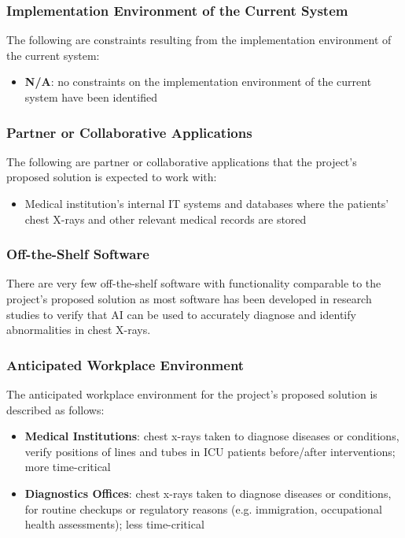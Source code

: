 \documentclass[12pt]{article}
\begin{document}
\subsubsection{Implementation Environment of the Current System}
The following are constraints resulting from the implementation environment of the current system:
\begin{itemize}
    \item \textbf{N/A}: no constraints on the implementation environment of the current system have been identified
\end{itemize}

\subsubsection{Partner or Collaborative Applications}
The following are partner or collaborative applications that the project’s proposed solution is expected to work with:
\begin{itemize}
    \item Medical institution’s internal IT systems and databases where the patients’ chest X-rays and other relevant medical records are stored
\end{itemize}

\subsubsection{Off-the-Shelf Software}
There are very few off-the-shelf software with functionality comparable to the project’s proposed solution as most software has been developed in research studies to verify that AI can be used to accurately diagnose and identify abnormalities in chest X-rays. 

\subsubsection{Anticipated Workplace Environment}
The anticipated workplace environment for the project’s proposed solution is described as follows:
\begin{itemize}
    \item \textbf{Medical Institutions}: chest x-rays taken to diagnose diseases or conditions, verify positions of lines and tubes in ICU patients before/after interventions; more time-critical
    \item \textbf{Diagnostics Offices}: chest x-rays taken to diagnose diseases or conditions, for routine checkups or regulatory reasons (e.g. immigration, occupational health assessments); less time-critical
\end{itemize}
\end{document}

